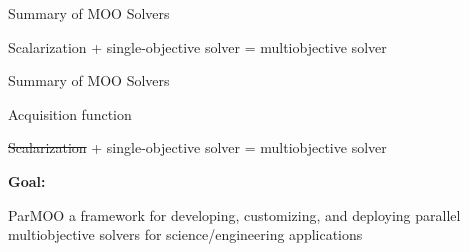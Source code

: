 \documentclass[aspectratio=169]{beamer}
\begin{document}
\begin{frame}{Summary of MOO Solvers}

\begin{center}
{\Large
Scalarization + single-objective solver
= multiobjective solver
}

\bigskip
\bigskip
\bigskip
\bigskip

\end{center}
\end{frame}

\begin{frame}{Summary of MOO Solvers}

{\Large
{\color{green} Acquisition function}$\qquad\qquad\qquad$\\
}
\begin{center}
{\Large
{\color{red}\sout{Scalarization}} + single-objective solver
= multiobjective solver
}

\bigskip
\bigskip
\pause

{\Large \bf Goal:}

\medskip

{\Large
ParMOO a framework for developing, customizing, and deploying
parallel multiobjective solvers for science/engineering applications}
\end{center}

\end{frame}
\end{document}
